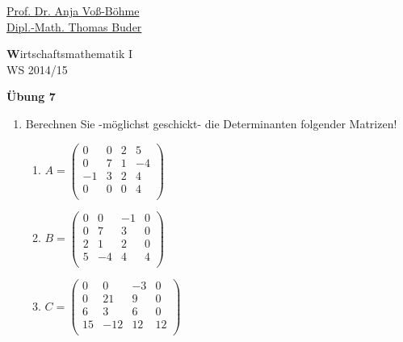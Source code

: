 \documentclass[12pt,a4paper]{scrreprt}
\begin{document}
 
\begin{flushleft}
\href{mailto:anja.voss-boehme@htw-dresden.de}{Prof. Dr. Anja Voß-Böhme} \\
\href{mailto:buder@htw-dresden.de}{Dipl.-Math. Thomas Buder}
\end{flushleft}

\begin{center}{\large\textbf Wirtschaftsmathematik I} \\ WS 2014/15 \end{center}

\begin{center}
\large{\textbf{ Übung 7 }} 
\end{center}

\bigskip
\begin{enumerate}

	\item Berechnen Sie -möglichst geschickt- die Determinanten folgender Matrizen!
	\begin{enumerate}
		\item $A=\begin{pmatrix}
0 & 0 & 2 & 5 \\
0 & 7 & 1 & -4  \\
-1 & 3 & 2 & 4\\
0 & 0 & 0 & 4 \\
\end{pmatrix}$


		\item $B=\begin{pmatrix}
0 & 0 & -1 & 0 \\
0 & 7 & 3 & 0  \\
2 & 1 & 2 & 0\\
5 & -4 & 4 & 4 \\
\end{pmatrix}$


		\item $C=\begin{pmatrix}
0 & 0 & -3 & 0 \\
0 & 21 & 9 & 0  \\
6 & 3 & 6 & 0\\
15 & -12 & 12 & 12 \\
\end{pmatrix}$


\begin{comment}
\item $D=\begin{pmatrix}
0 & 0 & -3 & 0 \\
0 & 21 & 9 & 0  \\
6 & 3 & 6 & 0\\
21 & -9 & 18 & 12 \\
\end{pmatrix}$
\end{comment}


\end{enumerate}
\end{enumerate}
\end{document}
